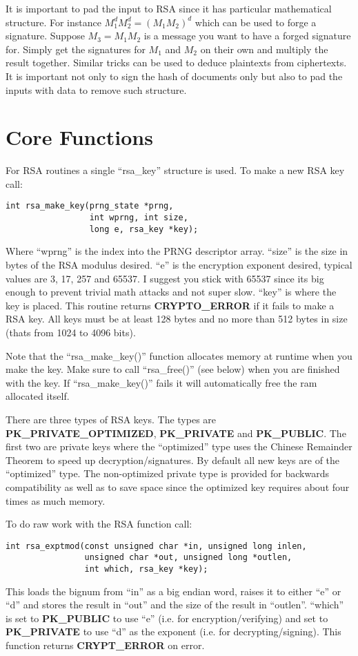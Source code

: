 \documentclass{book}
\begin{document}
It is important to pad the input to RSA since it has particular mathematical structure.  For instance  
$M_1^dM_2^d = (M_1M_2)^d$ which can be used to forge a signature.  Suppose $M_3 = M_1M_2$ is a message you want
to have a forged signature for.  Simply get the signatures for $M_1$ and $M_2$ on their own and multiply the result
together.  Similar tricks can be used to deduce plaintexts from ciphertexts.  It is important not only to sign 
the hash of documents only but also to pad the inputs with data to remove such structure.  

\section{Core Functions}

For RSA routines a single ``rsa\_key'' structure is used.  To make a new RSA key call:
\begin{verbatim}
int rsa_make_key(prng_state *prng, 
                 int wprng, int size, 
                 long e, rsa_key *key);
\end{verbatim}

Where ``wprng'' is the index into the PRNG descriptor array.  ``size'' is the size in bytes of the RSA modulus desired.
``e'' is the encryption exponent desired, typical values are 3, 17, 257 and 65537.  I suggest you stick with 65537 since its big
enough to prevent trivial math attacks and not super slow.  ``key'' is where the key is placed.  This routine returns
{\bf CRYPTO\_ERROR} if it fails to make a RSA key.  All keys must be at least 128 bytes and no more than 512 bytes
in size (thats from 1024 to 4096 bits).

Note that the ``rsa\_make\_key()'' function allocates memory at runtime when you make the key.  Make sure to call 
``rsa\_free()'' (see below) when you are finished with the key.  If ``rsa\_make\_key()'' fails it will automatically 
free the ram allocated itself.

There are three types of RSA keys.  The types are {\bf PK\_PRIVATE\_OPTIMIZED}, {\bf PK\_PRIVATE} and {\bf PK\_PUBLIC}.  The first
two are private keys where the ``optimized'' type uses the Chinese Remainder Theorem to speed up decryption/signatures.  By 
default all new keys are of the ``optimized'' type.  The non-optimized private type is provided for backwards compatibility
as well as to save space since the optimized key requires about four times as much memory.

To do raw work with the RSA function call:
\begin{verbatim}
int rsa_exptmod(const unsigned char *in, unsigned long inlen, 
                unsigned char *out, unsigned long *outlen, 
                int which, rsa_key *key);
\end{verbatim}
This loads the bignum from ``in'' as a big endian word, raises it to either ``e'' or ``d'' and stores the result
in ``out'' and the size of the result in ``outlen''. ``which'' is set to {\bf PK\_PUBLIC} to use ``e'' 
(i.e. for encryption/verifying) and set to {\bf PK\_PRIVATE} to use ``d'' as the exponent (i.e. for decrypting/signing).
This function returns {\bf CRYPT\_ERROR} on error.
\end{document}
